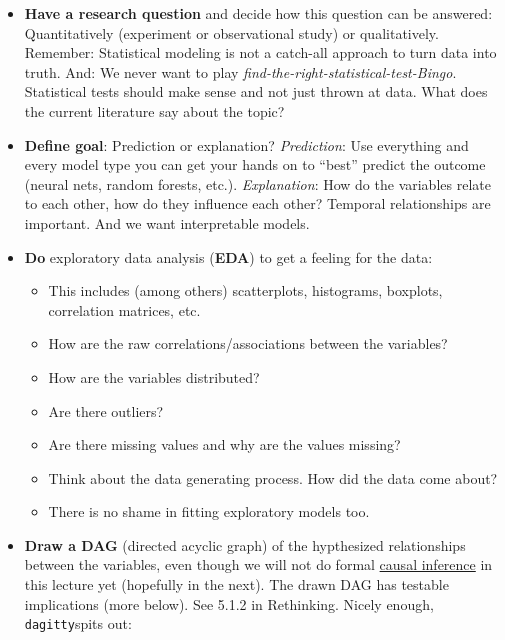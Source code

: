 \documentclass[
]{book}
\providecommand{\tightlist}{%
  \setlength{\itemsep}{0pt}\setlength{\parskip}{0pt}}
\begin{document}
\begin{itemize}
\item
  \textbf{Have a research question} and decide how this question can be answered:
  Quantitatively (experiment or observational study) or
  qualitatively.
  Remember: Statistical modeling is not a catch-all approach to
  turn data into truth.
  And: We never want to play \emph{find-the-right-statistical-test-Bingo}.
  Statistical tests should make sense and not just thrown at data.
  What does the current literature say about the topic?
\item
  \textbf{Define goal}: Prediction or explanation?
  \emph{Prediction}: Use everything and every model type you can get your hands
  on to ``best'' predict the outcome (neural nets, random forests, etc.).
  \emph{Explanation}: How do the variables relate to each other,
  how do they influence each other? Temporal relationships are important.
  And we want interpretable models.
\item
  \textbf{Do} exploratory data analysis (\textbf{EDA}) to get a feeling for the data:

  \begin{itemize}
  \tightlist
  \item
    This includes (among others) scatterplots, histograms, boxplots,
    correlation matrices, etc.
  \item
    How are the raw correlations/associations between the variables?
  \item
    How are the variables distributed?
  \item
    Are there outliers?
  \item
    Are there missing values and why are the values missing?
  \item
    Think about the data generating process. How did the data come about?
  \item
    There is no shame in fitting exploratory models too.
  \end{itemize}
\item
  \textbf{Draw a DAG} (directed acyclic graph) of the hypthesized relationships between
  the variables, even though we will not do formal
  \href{https://miguelhernan.org/whatifbook}{causal inference} in this lecture yet
  (hopefully in the next).
  The drawn DAG has testable implications (more below). See 5.1.2 in Rethinking.
  Nicely enough, \texttt{dagitty}spits out:


\end{itemize}
\end{document}
